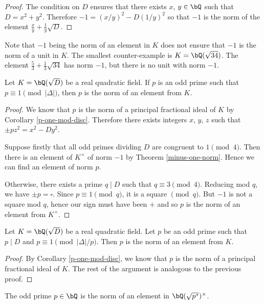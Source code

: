 \begin{proof}
The condition on $D$ ensures that there exists $x$, $y \in \bQ$ such that $D = x^2 + y^2$. Therefore $-1 = (x / y)^2 - D(1/ y)^2$ so that $-1$ is the norm of the element $\frac{x}{y} + \frac{1}{y} \sqrt{D}$.
\end{proof}

Note that $-1$ being the norm of an element in $K$ does not ensure that $-1$ is the norm of a unit in $K$. The smallest counter-example is $K = \bQ(\sqrt{34})$. The element $\frac{5}{3} + \frac{1}{3}\sqrt{34}$ has norm $-1$, but there is no unit with norm $-1$. 

\begin{thm}\label{p-norm-elem-1}
    Let $K = \bQ(\sqrt{D})$ be a real quadratic field.  If $p$ is an odd prime such that $p \equiv 1 \pmod {|\Delta|}$, then $p$ is the norm of an element from $K$. 
\end{thm}

\begin{proof}
    We know that $p$ is the norm of a principal fractional ideal of $K$ by Corollary \ref{p-one-mod-disc}. 
    Therefore there exists integers $x$, $y$, $z$ such that $\pm p z^2 = x^2 - Dy^2$. 
    
    Suppose firstly that all odd primes dividing $D$ are congruent to $1 \pmod 4$. Then there is an element of $K^{\times}$ of norm $-1$ by Theorem \ref{minus-one-norm}. Hence we can find an element of norm $p$.

    Otherwise, there exists a prime $q \mid D$ such that $q \equiv 3 \pmod 4$. Reducing mod $q$, we have
    $ \pm p = \square$. Since $p \equiv 1 \pmod q$, it is a square $\pmod q$. But $-1$ is not a square mod $q$, hence our sign must have been $+$ and so $p$ is the norm of an element from $K^{\times}$.
\end{proof}


\begin{thm}\label{p-norm-elem-2}
    Let $K = \bQ(\sqrt{D})$ be a real quadratic field. Let $p$ be an odd prime such that $p \mid D$ and $p \equiv 1 \pmod {|\Delta| / p}$. Then $p$ is the norm of an element from $K$. 
\end{thm}

\begin{proof}
    By Corollary \ref{p-one-mod-disc}, we know that $p$ is the norm of a principal fractional ideal of $K$. The rest of the argument is analogous to the previous proof.
\end{proof}  

\begin{cor}\label{p-norm}
The odd prime $p \in \bQ$ is the norm of an element in $\bQ(\sqrt{p^*})^{\times}$.
\end{cor}

